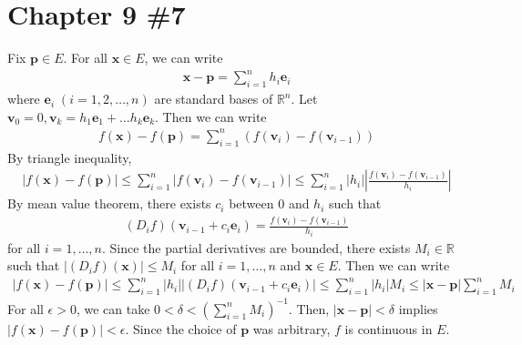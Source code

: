 \documentclass{scrartcl}
\begin{document}
\section{Chapter 9 \#7}
Fix \(\mathbf{p} \in E\). For all \(\mathbf{x} \in E\), we can write
\begin{align*}
  \mathbf{x} - \mathbf{p}
  = \sum^n_{i = 1} h_i \mathbf{e}_i
\end{align*}
where \(\mathbf{e}_i\; (i = 1, 2, \dots, n)\) are standard bases of
\(\mathbb{R}^n\). Let \(\mathbf{v}_0 = 0, \mathbf{v}_k = h_1 \mathbf{e}_1 +
\dots h_k \mathbf{e}_k\). Then we can write
\begin{align*}
  f(\mathbf{x}) - f(\mathbf{p})
  = \sum^n_{i = 1} (f(\mathbf{v}_i) - f(\mathbf{v}_{i - 1}))
\end{align*}
By triangle inequality,
\begin{align*}
  |f(\mathbf{x}) - f(\mathbf{p})|
  \le \sum^n_{i = 1} |f(\mathbf{v}_i) - f(\mathbf{v}_{i - 1})|
  \le \sum^n_{i = 1} |h_i| \left| \frac{f(\mathbf{v}_i)
    - f(\mathbf{v}_{i - 1})}{h_i} \right|
\end{align*}
By mean value theorem, there exists \(c_i\) between 0 and \(h_i\) such that
\begin{align*}
  (D_i f) (\mathbf{v}_{i - 1} + c_i \mathbf{e}_i)
  = \frac{f(\mathbf{v}_i) - f(\mathbf{v}_{i - 1})}{h_i}
\end{align*}
for all \(i = 1, \dots, n\). Since the partial derivatives are bounded, there
exists \(M_i \in \mathbb{R}\) such that \(|(D_i f) (\mathbf{x})| \le M_i\) for
all \(i = 1, \dots, n\) and \(\mathbf{x} \in E\). Then we can write
\begin{align*}
  |f(\mathbf{x}) - f(\mathbf{p})|
  \le \sum^n_{i = 1} |h_i| |(D_i f) (\mathbf{v}_{i - 1} + c_i \mathbf{e}_i)|
  \le \sum^n_{i = 1} |h_i| M_i
  \le |\mathbf{x} - \mathbf{p}| \sum^n_{i = 1} M_i
\end{align*}
For all \(\epsilon > 0\), we can take \(0 < \delta < \left( \sum^n_{i = 1} M_i
\right)^{-1}\). Then, \(|\mathbf{x} - \mathbf{p}| < \delta\) implies
\(|f(\mathbf{x}) - f(\mathbf{p})| < \epsilon\). Since the choice of
\(\mathbf{p}\) was arbitrary, \(f\) is continuous in \(E\).
\end{document}
